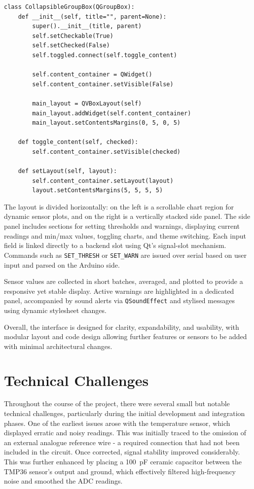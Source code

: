 \documentclass[a4paper,11pt]{article}
\begin{document}
\begin{lstlisting}[style=python-style, 
caption={CollapsibleGroupBox class}, label={prog:CGB_class}]
class CollapsibleGroupBox(QGroupBox):
    def __init__(self, title="", parent=None):
        super().__init__(title, parent)
        self.setCheckable(True)
        self.setChecked(False) 
        self.toggled.connect(self.toggle_content)

        self.content_container = QWidget()
        self.content_container.setVisible(False)

        main_layout = QVBoxLayout(self)
        main_layout.addWidget(self.content_container)
        main_layout.setContentsMargins(0, 5, 0, 5)  

    def toggle_content(self, checked):
        self.content_container.setVisible(checked)

    def setLayout(self, layout):
        self.content_container.setLayout(layout)
        layout.setContentsMargins(5, 5, 5, 5)
\end{lstlisting}

The layout is divided horizontally: on the left is a scrollable chart region 
for dynamic sensor plots, and on the right is a vertically stacked side panel. 
The side panel includes sections for setting thresholds and warnings, 
displaying current readings and min/max values, toggling charts,
and theme switching. 
Each input field is linked directly to a backend slot using Qt's signal-slot mechanism. 
Commands such as \texttt{SET\_THRESH} or \texttt{SET\_WARN} 
are issued over serial based on user input and parsed on the Arduino side.

Sensor values are collected in short batches, averaged, 
and plotted to provide a responsive yet stable display. 
Active warnings are highlighted in a dedicated panel, 
accompanied by sound alerts via \texttt{QSoundEffect} 
and stylised messages using dynamic stylesheet changes.

Overall, the interface is designed for clarity, expandability, 
and usability, with modular layout and code design 
allowing further features or sensors to be added with minimal architectural changes.

\section{Technical Challenges}
\label{sec:technical_challenges}

Throughout the course of the project, there were several small 
but notable technical challenges, 
particularly during the initial development and integration phases. 
One of the earliest issues arose with the temperature sensor, 
which displayed erratic and noisy readings. 
This was initially traced to the omission of an external analogue reference wire -
a required connection that had not been included in the circuit.
Once corrected, signal stability improved considerably. 
This was further enhanced by placing a \SI{100}{\pico\farad} ceramic capacitor 
between the TMP36 sensor's output and ground, 
which effectively filtered high-frequency noise and smoothed the ADC readings.
\end{document}
